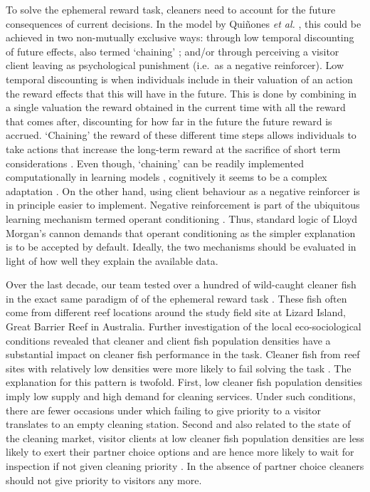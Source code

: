 \documentclass[]{rsos}%
\begin{document}
To solve the ephemeral reward task, cleaners need to account for
the future consequences of current decisions. In the model by
Quiñones \emph{et al.} \citep{quinones_Reinforcement_2019}, this could be achieved in
two non-mutually exclusive ways: through low temporal discounting of
future effects, also termed `chaining' \citep{enquist_Power_2016}; and/or
through perceiving a visitor client leaving as psychological punishment
(i.e.~as a negative reinforcer). Low temporal discounting is when
individuals include in their valuation of an action the reward effects
that this will have in the future. This is done by combining in a single
valuation the reward obtained in the current time with all the reward that
comes after, discounting for how far in the future the future reward
is accrued. `Chaining' the reward of these different time steps allows
individuals to take actions that increase the long-term reward at the sacrifice
of short term considerations \citep{enquist_Power_2016}. Even though, `chaining'
can be readily implemented computationally in learning models
\citep{enquist_Power_2016, sutton_Reinforcement_2018}, cognitively it seems to be
a complex adaptation \citep{suddendorf_Evolution_2007}. On the other hand,
using client behaviour as a negative reinforcer is in principle
easier to implement. Negative reinforcement is part of the ubiquitous
learning mechanism termed operant conditioning \citep{thorndike_Animal_1898, skinner_Behavior_1938}. Thus, standard logic of
Lloyd Morgan's cannon demands that operant conditioning as the simpler
explanation is to be accepted by default. Ideally, the two mechanisms should
be evaluated in light of how well they explain the available data.

Over the last decade, our team tested over a hundred of wild-caught
cleaner fish in the exact same paradigm of of the ephemeral reward
task \citep{salwiczek_Adult_2012, wismer_Variation_2014, triki_Decrease_2018, triki_Biological_2019, triki_Brain_2020}. These fish often come from
different reef locations around the study field site at Lizard Island,
Great Barrier Reef in Australia. Further investigation of the local
eco-sociological conditions revealed that cleaner and client
fish population densities have a substantial impact on cleaner fish
performance in the task. Cleaner fish from reef sites with relatively
low densities were more likely to fail solving the task \citep{triki_Biological_2019, triki_Decrease_2018, wismer_Variation_2014}. The explanation for this pattern
is twofold. First, low cleaner fish population densities imply
low supply and high demand for cleaning services.
Under such conditions, there are fewer occasions under
which failing to give priority to a visitor translates to an empty
cleaning station. Second and also related to the state of the cleaning market,
visitor clients at low cleaner fish population densities
are less likely to exert their partner choice options
and are hence more likely to wait for inspection if not given cleaning
priority \citep{triki_Brain_2020}. In the absence of partner choice
cleaners should not give priority to visitors any more.
\end{document}
